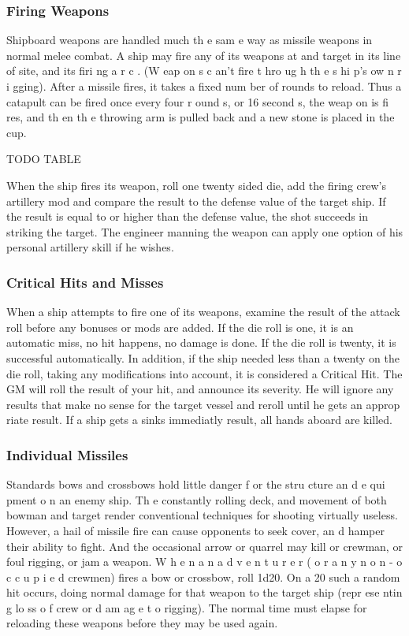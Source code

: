 \begin{multicols*}{2}
\subsubsection{Firing Weapons}
Shipboard weapons are handled much th e sam e
way as missile weapons in normal melee combat. A ship may
fire any of its weapons at and target in its line of site, and its
firi ng a r c . (W eap on s c an’t fire t hro ug h th e s hi p’s ow n
r i gging). After a missile fires, it takes a fixed num ber of
rounds to reload. Thus a catapult can be fired once every four
r ound s, or 16 second s, the weap on is fi res, and th en th e
throwing arm is pulled back and a new stone is placed in the
cup.

TODO TABLE 

When the ship fires its weapon, roll one twenty
sided die, add the firing crew’s artillery mod and compare the
result to the defense value of the target ship. If the result is
equal to or higher than the defense value, the shot succeeds in
striking the target. The engineer manning the weapon can
apply one option of his personal artillery skill if he wishes.
\subsubsection{Critical Hits and Misses}
When a ship attempts to fire one of its weapons,
examine the result of the attack roll before any bonuses or
mods are added. If the die roll is one, it is an automatic miss,
no hit happens, no damage is done. If the die roll is twenty, it
is successful automatically. In addition, if the ship needed less
than a twenty on the die roll, taking any modifications into
account, it is considered a Critical Hit. The GM will roll the
result of your hit, and announce its severity. He will ignore
any results that make no sense for the target vessel and reroll
until he gets an approp riate result. If a ship gets a sinks
immediatly result, all hands aboard are killed.
\subsubsection{Individual Missiles}
Standards bows and crossbows hold little danger
f or the stru cture an d e qui pment o n an enemy ship. Th e
constantly rolling deck, and movement of both bowman and
target render conventional techniques for shooting virtually
useless. However, a hail of missile fire can cause opponents
to seek cover, an d hamper their ability to fight. And the
occasional arrow or quarrel may kill or crewman, or foul
rigging, or jam a weapon.
W h e n a n a d v e n t u r e r ( o r a n y n o n - o c c u p i e d
crewmen) fires a bow or crossbow, roll 1d20. On a 20 such a
random hit occurs, doing normal damage for that weapon to
the target ship (repr ese ntin g lo ss o f crew or d am ag e t o
rigging). The normal time must elapse for reloading these
weapons before they may be used again.

\end{multicols*}

